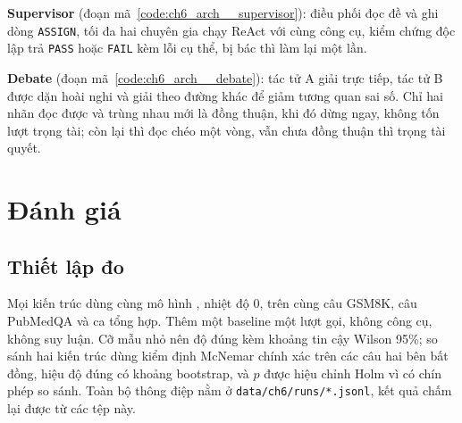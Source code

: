 
\textbf{Supervisor} (đoạn mã~\ref{code:ch6_arch__supervisor}): điều phối đọc đề và ghi dòng \texttt{ASSIGN}, tối đa hai chuyên gia chạy ReAct với cùng công cụ, kiểm chứng độc lập trả \texttt{PASS} hoặc \texttt{FAIL} kèm lỗi cụ thể, bị bác thì làm lại một lần.


\textbf{Debate} (đoạn mã~\ref{code:ch6_arch__debate}): tác tử A giải trực tiếp, tác tử B được dặn hoài nghi và giải theo đường khác để giảm tương quan sai số. Chỉ hai nhãn đọc được và trùng nhau mới là đồng thuận, khi đó dừng ngay, không tốn lượt trọng tài; còn lại thì đọc chéo một vòng, vẫn chưa đồng thuận thì trọng tài quyết.


\section{Đánh giá}
\subsection{Thiết lập đo}
Mọi kiến trúc dùng cùng mô hình \texttt{}, nhiệt độ 0, trên cùng  câu GSM8K,  câu PubMedQA và  ca tổng hợp. Thêm một baseline một lượt gọi, không công cụ, không suy luận. Cỡ mẫu nhỏ nên độ đúng kèm khoảng tin cậy Wilson 95\%; so sánh hai kiến trúc dùng kiểm định McNemar chính xác trên các câu hai bên bất đồng, hiệu độ đúng có khoảng bootstrap, và $p$ được hiệu chỉnh Holm vì có chín phép so sánh. Toàn bộ thông điệp nằm ở \texttt{data/ch6/runs/*.jsonl}, kết quả chấm lại được từ các tệp này.


